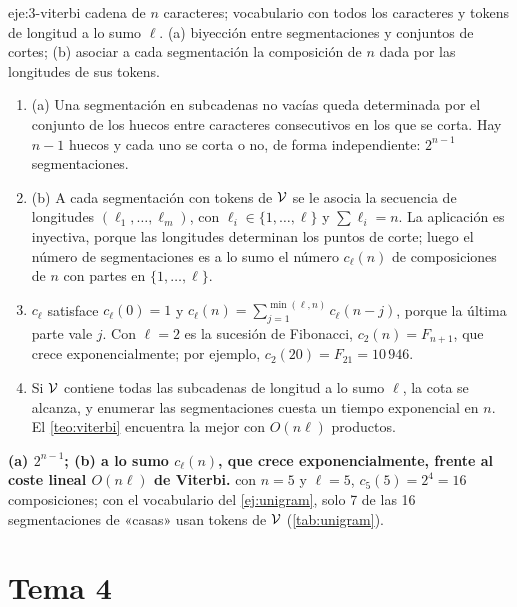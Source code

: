 \begin{solucion}{eje:3-viterbi}
\datos cadena de $n$ caracteres; vocabulario con todos los caracteres y tokens de longitud a lo sumo $\ell$.
\planteamiento (a) biyección entre segmentaciones y conjuntos de cortes; (b) asociar a cada segmentación la composición de $n$ dada por las longitudes de sus tokens.
\pasos
\begin{enumerate}[label=\arabic*.]
  \item (a) Una segmentación en subcadenas no vacías queda determinada por el conjunto de los huecos entre caracteres consecutivos en los que se corta. Hay $n-1$ huecos y cada uno se corta o no, de forma independiente: $2^{n-1}$ segmentaciones.
  \item (b) A cada segmentación con tokens de $\mathcal{V}$ se le asocia la secuencia de longitudes $(\ell_1,\dots,\ell_m)$, con $\ell_i\in\{1,\dots,\ell\}$ y $\sum\ell_i=n$. La aplicación es inyectiva, porque las longitudes determinan los puntos de corte; luego el número de segmentaciones es a lo sumo el número $c_{\ell}(n)$ de composiciones de $n$ con partes en $\{1,\dots,\ell\}$.
  \item $c_{\ell}$ satisface $c_{\ell}(0)=1$ y $c_{\ell}(n)=\sum_{j=1}^{\min(\ell,n)}c_{\ell}(n-j)$, porque la última parte vale $j$. Con $\ell=2$ es la sucesión de Fibonacci, $c_2(n)=F_{n+1}$, que crece exponencialmente; por ejemplo, $c_2(20)=F_{21}=10\,946$.
  \item Si $\mathcal{V}$ contiene todas las subcadenas de longitud a lo sumo $\ell$, la cota se alcanza, y enumerar las segmentaciones cuesta un tiempo exponencial en $n$. El \cref{teo:viterbi} encuentra la mejor con $O(n\ell)$ productos.
\end{enumerate}
\resultado \textbf{(a) $2^{n-1}$; (b) a lo sumo $c_{\ell}(n)$, que crece exponencialmente, frente al coste lineal $O(n\ell)$ de Viterbi.}
\comprobacion con $n=5$ y $\ell=5$, $c_5(5)=2^{4}=16$ composiciones; con el vocabulario del \cref{ej:unigram}, solo 7 de las 16 segmentaciones de «casas» usan tokens de $\mathcal{V}$ (\cref{tab:unigram}).
\end{solucion}

\section{Tema 4}

